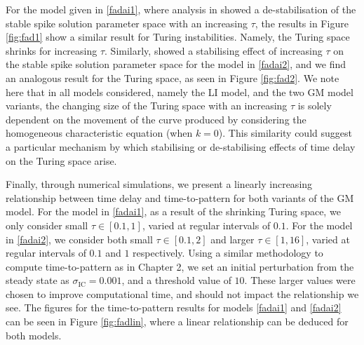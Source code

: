 For the model given in \eqref{fadai1}, where analysis in \cite{fadai1} showed a de-stabilisation of the stable spike solution parameter space with an increasing $\tau$, the results in Figure \ref{fig:fad1} show a similar result for Turing instabilities. Namely, the Turing space shrinks for increasing $\tau$. Similarly, \cite{fadai2} showed a stabilising effect of increasing $\tau$ on the stable spike solution parameter space for the model in \eqref{fadai2}, and we find an analogous result for the Turing space, as seen in Figure \ref{fig:fad2}. We note here that in all models considered, namely the LI model, and the two GM model variants, the changing size of the Turing space with an increasing $\tau$ is solely dependent on the movement of the curve produced by considering the homogeneous characteristic equation (when $k=0$). This similarity could suggest a particular mechanism by which stabilising or de-stabilising effects of time delay on the Turing space arise.

Finally, through numerical simulations, we present a linearly increasing relationship between time delay and time-to-pattern for both variants of the GM model. For the model in \eqref{fadai1}, as a result of the shrinking Turing space, we only consider small $\tau\in[0.1,1]$, varied at regular intervals of $0.1$. For the model in \eqref{fadai2}, we consider both small $\tau\in[0.1,2]$ and larger $\tau\in[1,16]$, varied at regular intervals of $0.1$ and $1$ respectively. Using a similar methodology to compute time-to-pattern as in Chapter 2, we set an initial perturbation from the steady state as $\sigma_{\text{IC}}=0.001$, and a threshold value of $10$. These larger values were chosen to improve computational time, and should not impact the relationship we see. The figures for the time-to-pattern results for models \eqref{fadai1} and \eqref{fadai2} can be seen in Figure \ref{fig:fadlin}, where a linear relationship can be deduced for both models.

